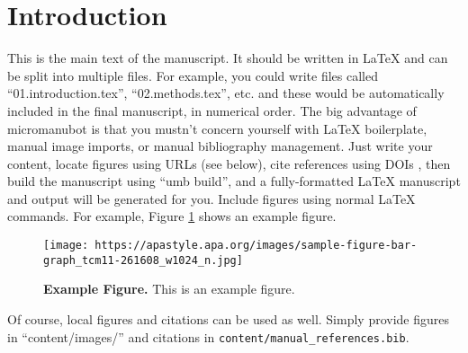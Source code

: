 \section{Introduction}

This is the main text of the manuscript.
It should be written in LaTeX and can be split into multiple files.
For example, you could write files called ``01.introduction.tex'', ``02.methods.tex'', etc. and these would be automatically included in the final manuscript, in numerical order.
The big advantage of micromanubot is that you mustn't concern yourself with LaTeX boilerplate, manual image imports, or manual bibliography management.
Just write your content, locate figures using URLs (see below), cite references using DOIs \cite{@doi:10.1103/PhysRev.47.777}, then build the manuscript using ``umb build'', and a fully-formatted LaTeX manuscript and output will be generated for you.
Include figures using normal LaTeX commands.
For example, Figure \ref{fig:example} shows an example figure.

\begin{figure}[H]
    \centering
    \texttt{[image: https://apastyle.apa.org/images/sample-figure-bar-graph\_tcm11-261608\_w1024\_n.jpg]}
    \caption{
        \textbf{Example Figure.} 
        This is an example figure.
    }
    \label{fig:example}
\end{figure}

Of course, local figures and citations can be used as well.
Simply provide figures in ``content/images/'' and citations \cite{umb} in \texttt{content/manual\_references.bib}.
